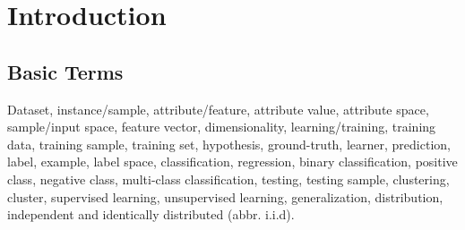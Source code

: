 \section{Introduction}

\subsection{Basic Terms}

Dataset, instance/sample, attribute/feature, attribute value, attribute space,
sample/input space, feature vector, dimensionality, learning/training,
training data, training sample, training set, hypothesis, ground-truth,
learner, prediction, label, example, label space, classification, regression,
binary classification, positive class, negative class, multi-class
classification, testing, testing sample, clustering, cluster, supervised
learning, unsupervised learning, generalization, distribution, independent
and identically distributed (abbr. i.i.d).
